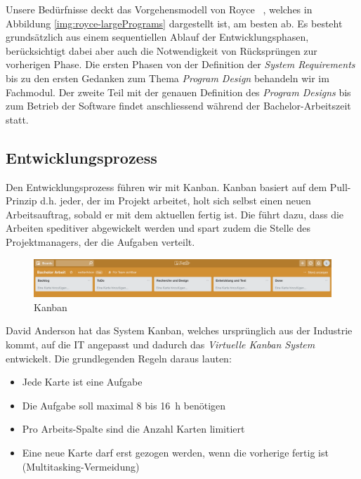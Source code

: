 Unsere Bedürfnisse deckt das Vorgehensmodell von Royce ~\cite{Royce1970}, welches in Abbildung  \ref{img:royce-largePrograms} dargestellt ist, am besten ab. Es besteht grundsätzlich aus einem sequentiellen Ablauf der Entwicklungsphasen, berücksichtigt dabei aber auch die Notwendigkeit von Rücksprüngen zur vorherigen Phase.
Die ersten Phasen von der Definition der \textit{System Requirements} bis zu den ersten Gedanken zum Thema \textit{Program Design} behandeln wir im Fachmodul. Der zweite Teil mit der genauen Definition des \textit{Program Designs} bis zum Betrieb der Software findet anschliessend während der Bachelor-Arbeitszeit statt.


\subsection{Entwicklungsprozess}
Den Entwicklungsprozess führen wir mit Kanban. Kanban basiert auf dem Pull-Prinzip d.h. jeder, der im Projekt arbeitet, holt sich selbst einen neuen Arbeitsauftrag, sobald er mit dem aktuellen fertig ist. Die führt dazu, dass die Arbeiten speditiver abgewickelt werden und spart zudem die Stelle des Projektmanagers, der die Aufgaben verteilt.

\begin{figure}[htbp]
	\centering
	\includegraphics[width=1\linewidth]{img/kanban}
	\caption{Kanban}
	\label{img:kanban}
\end{figure}


David Anderson \cite{AndersonDavidJ2011K:eC} hat das System Kanban, welches ursprünglich aus der Industrie kommt, auf die IT angepasst und dadurch das \textit{Virtuelle Kanban System} entwickelt. Die grundlegenden Regeln daraus lauten:

\begin{itemize}  
\item Jede Karte ist eine Aufgabe
\item Die Aufgabe soll maximal 8 bis 16~h benötigen
\item Pro Arbeits-Spalte sind die Anzahl Karten limitiert
\item Eine neue Karte darf erst gezogen werden, wenn die vorherige fertig ist (Multitasking-Vermeidung)
\end{itemize}


